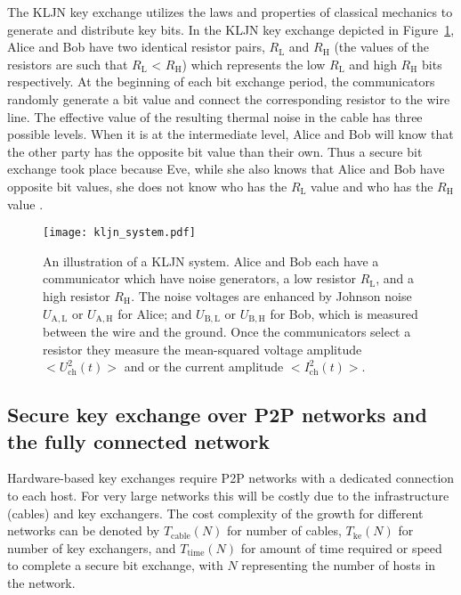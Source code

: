\documentclass[a4paper,12pt,pdftex]{article}
\begin{document}
The KLJN key exchange utilizes the laws and properties of classical mechanics \cite{kljn1} to generate and distribute key bits. In the KLJN key exchange depicted in Figure~\ref{fig:kljn_sys}, Alice and Bob have two identical resistor pairs, $R_\mathrm{L}$ and $R_\mathrm{H}$ (the values of the resistors are such that $R_\mathrm{L}$ < $R_\mathrm{H}$) which represents the low $R_\mathrm{L}$ and high $R_\mathrm{H}$ bits respectively. At the beginning of each bit exchange period, the communicators randomly generate a bit value and connect the corresponding resistor to the wire line. The effective value of the resulting thermal noise in the cable has three possible levels. When it is at the intermediate level, Alice and Bob will know that the other party has the opposite bit value than their own. Thus a secure bit exchange took place because Eve, while she also knows that Alice and Bob have opposite bit values, she does not know who has the $R_\mathrm{L}$ value and who has the $R_\mathrm{H}$ value \cite{kljn1, lk2}.

\begin{figure}[h]
    \caption{An illustration of a KLJN system. Alice and Bob each have a communicator which have noise generators, a low resistor $R_\mathrm{L}$, and a high resistor $R_\mathrm{H}$. The noise voltages are enhanced by Johnson noise $U_\mathrm{A,L}$ or $U_\mathrm{A,H}$ for Alice; and $U_\mathrm{B,L}$ or $U_\mathrm{B,H}$ for Bob, which is measured between the wire and the ground. Once the communicators select a resistor they measure the mean-squared voltage amplitude $<U^{2}_\mathrm{ch}(t)>$ and or the current amplitude $<I^{2}_\mathrm{ch}(t)>$.}
    \label{fig:kljn_sys}
  \centering
\texttt{[image: kljn\_system.pdf]}
\end{figure}



\subsection{Secure key exchange over P2P networks and the fully connected network}

Hardware-based key exchanges require P2P networks with a dedicated connection to each host. For very large networks this will be costly due to the infrastructure (cables) and key exchangers. The cost complexity of the growth for different networks can be denoted by $T_\mathrm{cable}(N)$ for number of cables, $T_\mathrm{ke}(N)$ for number of key exchangers, and $T_\mathrm{time}(N)$ for amount of time required or speed to complete a secure bit exchange, with $N$ representing the number of hosts in the network. 
\end{document}
